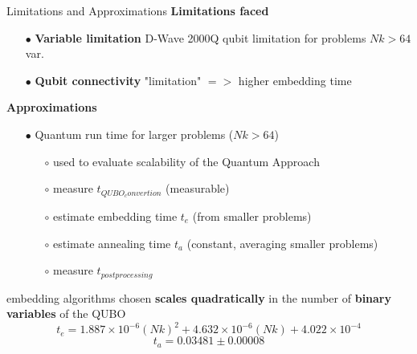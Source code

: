 		\begin{frame}[allowframebreaks]{Limitations and Approximations}
			\textbf{Limitations faced}
			\begin{itemize}
				\item[$\bullet$] \textbf{Variable limitation} D-Wave 2000Q qubit limitation for problems $Nk > 64$ var.
				\item[$\bullet$] \textbf{Qubit connectivity} "limitation" $=>$ higher embedding time
			\end{itemize}
			\textbf{Approximations}
			\begin{itemize}
				\item[$\bullet$] Quantum run time for larger problems ($Nk > 64$)
				\begin{itemize}
					\item[$\circ$] used to evaluate scalability of the Quantum Approach
					\item[$\circ$] measure $t_{QUBO_convertion}$ (measurable)
					\item[$\circ$] estimate embedding time $t_{e}$ (from smaller problems)
					\item[$\circ$] estimate annealing time $t_{a}$ (constant, averaging smaller problems) 
					\item[$\circ$] measure $t_{postprocessing}$
				\end{itemize} 
			\end{itemize}
			embedding algorithms chosen \textbf{scales quadratically} in the number of \textbf{binary variables} of the QUBO
			\begin{equation}
				t_{e} = 1.887 \times 10^{-6}(Nk)^2 
				+ 4.632 \times 10^{-6}(Nk)
				+ 4.022 \times 10^{-4}
			\end{equation}
			\begin{equation}
				t_{a} = 0.03481 \pm 0.00008
			\end{equation}

		\end{frame}

